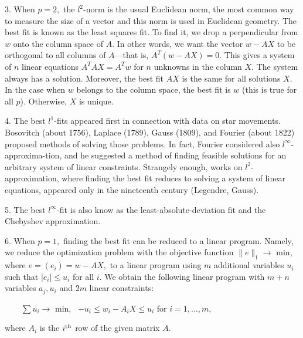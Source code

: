 3. When  $p=2,$ the $l^2$-norm is the usual 
 Euclidean norm,   the most common way to measure the size of a vector and this norm is 
used in Euclidean geometry.
The best fit is known as the least squares fit.  To find it, we drop a perpendicular from $w$ onto the column space  of $A.$   In other words, we want the
vector $w - AX$  to be orthogonal to all columns of $A$---that is,   $A^T(w-AX) = 0.$ This gives a system of $n$  linear equations 
$A^TAX = A^Tw$
for $n$ unknowns in the column $X.$ The system always has a solution. Moreover, the best fit
$AX$ is the same for all solutions $X.$ In the case when $w$ belongs to the column space, the best fit
is $w$  (this is true for all $p$). Otherwise, $X$ is unique.

4.  The best $l^1$-fits    appeared first  in connection with
data on star movements. Bosovitch (about 1756), Laplace (1789), Gauss (1809),
and Fourier (about 1822)
proposed methods of solving those problems. In fact, Fourier  considered
also $l^{\infty}$-approxima-tion, and he suggested a method of finding
feasible solutions for an arbitrary system of linear constraints.
Strangely enough, works on  $l^2$-approximation, where finding the best fit reduces to
solving a system of linear equations,  appeared only in the nineteenth century (Legendre, Gauss).

5. The best  $l^{\infty}$-fit is also know as  the 
least-absolute-deviation fit and the Chebyshev approximation.


6.  When $p=1, $ finding the best fit can be reduced to a linear program.
Namely, we  reduce the optimization problem with the objective function $\|e\|_1  \rightarrow$ min,
  where   $e = (e_i) = w - AX,$ to a linear program
using $m$ additional variables  $u_i$ such that  $|e_i| \le u_i$ for all $i.$
We obtain the following linear program  with  $m +n $ variables $a_j, u_i$
and  $2m$ linear constraints:
\bigskip

\ \ \ \ $\sum u_i \rightarrow $ min, \ $-u_i \le w_i - A_iX \le u_i$ for $i=1,\ldots, m,$
\bigskip

\noindent where  $A_i$ is the $i^{\rm th}$ 
 row of the given matrix $A.$ 

